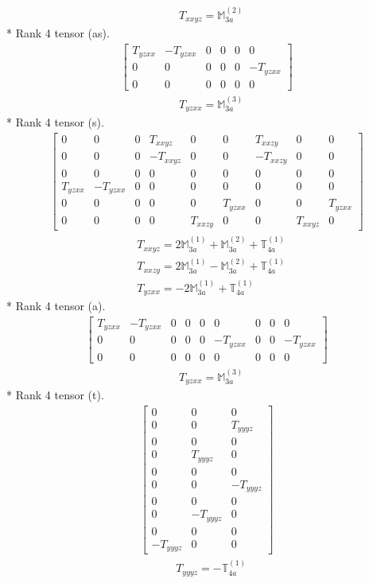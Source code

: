 \documentclass[fleqn,8pt,landscape]{jsarticle}
\begin{document}
\begin{align*}
& T_{xxyz} = \mathbb{M}_{3a}^{(2)}
\end{align*}
* Rank 4 tensor (as).
\begin{align*}
\begin{bmatrix} T_{yzxx} & - T_{yzxx} & 0 & 0 & 0 & 0 \\ 0 & 0 & 0 & 0 & 0 & - T_{yzxx} \\ 0 & 0 & 0 & 0 & 0 & 0 \end{bmatrix}
\end{align*}
\begin{align*}
& T_{yzxx} = \mathbb{M}_{3a}^{(3)}
\end{align*}
* Rank 4 tensor (s).
\begin{align*}
\begin{bmatrix} 0 & 0 & 0 & T_{xxyz} & 0 & 0 & T_{xxzy} & 0 & 0 \\ 0 & 0 & 0 & - T_{xxyz} & 0 & 0 & - T_{xxzy} & 0 & 0 \\ 0 & 0 & 0 & 0 & 0 & 0 & 0 & 0 & 0 \\ T_{yzxx} & - T_{yzxx} & 0 & 0 & 0 & 0 & 0 & 0 & 0 \\ 0 & 0 & 0 & 0 & 0 & T_{yzxx} & 0 & 0 & T_{yzxx} \\ 0 & 0 & 0 & 0 & T_{xxzy} & 0 & 0 & T_{xxyz} & 0 \end{bmatrix}
\end{align*}
\begin{align*}
& T_{xxyz} = 2 \mathbb{M}_{3a}^{(1)} + \mathbb{M}_{3a}^{(2)} + \mathbb{T}_{4a}^{(1)} \\
& T_{xxzy} = 2 \mathbb{M}_{3a}^{(1)} - \mathbb{M}_{3a}^{(2)} + \mathbb{T}_{4a}^{(1)} \\
& T_{yzxx} = - 2 \mathbb{M}_{3a}^{(1)} + \mathbb{T}_{4a}^{(1)}
\end{align*}
* Rank 4 tensor (a).
\begin{align*}
\begin{bmatrix} T_{yzxx} & - T_{yzxx} & 0 & 0 & 0 & 0 & 0 & 0 & 0 \\ 0 & 0 & 0 & 0 & 0 & - T_{yzxx} & 0 & 0 & - T_{yzxx} \\ 0 & 0 & 0 & 0 & 0 & 0 & 0 & 0 & 0 \end{bmatrix}
\end{align*}
\begin{align*}
& T_{yzxx} = \mathbb{M}_{3a}^{(3)}
\end{align*}
* Rank 4 tensor (t).
\begin{align*}
\begin{bmatrix} 0 & 0 & 0 \\ 0 & 0 & T_{yyyz} \\ 0 & 0 & 0 \\ 0 & T_{yyyz} & 0 \\ 0 & 0 & 0 \\ 0 & 0 & - T_{yyyz} \\ 0 & 0 & 0 \\ 0 & - T_{yyyz} & 0 \\ 0 & 0 & 0 \\ - T_{yyyz} & 0 & 0 \end{bmatrix}
\end{align*}
\begin{align*}
& T_{yyyz} = - \mathbb{T}_{4a}^{(1)}
\end{align*}
\end{document}

